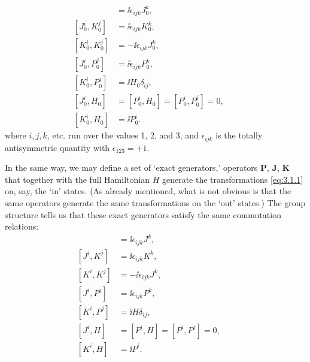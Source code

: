 \begin{align}
[J_0^i,J_0^j]&=\ii\epsilon_{ijk}J_0^k, &&\tag{3.3.4}\label{eq:3.3.4}\\
[J_0^i,K_0^j]&=\ii\epsilon_{ijk}K_0^k, &&\tag{3.3.5}\label{eq:3.3.5}\\
[K_0^i,K_0^j]&=-\ii\epsilon_{ijk}J_0^k, &&\tag{3.3.6}\label{eq:3.3.6}\\
[J_0^i,P_0^j]&=\ii\epsilon_{ijk}P_0^k, &&\tag{3.3.7}\label{eq:3.3.7}\\
[K_0^i,P_0^j]&=\ii H_0\delta_{ij}, &&\tag{3.3.8}\label{eq:3.3.8}\\
[J_0^i,H_0]&=[P_0^i,H_0]=[P_0^i,P_0^j]=0, &&\tag{3.3.9}\label{eq:3.3.9}\\
[K_0^i,H_0]&=\ii P_0^i. &&\tag{3.3.10}\label{eq:3.3.10}
\end{align}
where $i,j,k$, etc. run over the values 1, 2, and 3, and $\epsilon_{ijk}$ is the
totally antisymmetric quantity with $\epsilon_{123}=+1$.

In the same way, we may define a set of `exact generators,' operators
$\mathbf{P}$, $\mathbf{J}$, $\mathbf{K}$ that together with the full Hamiltonian
$H$ generate the transformations \eqref{eq:3.1.1} on, say, the `in' states. (As already
mentioned, what is not obvious is that the same operators generate the same
transformations on the `out' states.) The group structure tells us that these
exact generators satisfy the same commutation relations:
\begin{align}
[J^i,J^j]&=\ii\epsilon_{ijk}J^k, &&\tag{3.3.11}\label{eq:3.3.11}\\
[J^i,K^j]&=\ii\epsilon_{ijk}K^k, &&\tag{3.3.12}\label{eq:3.3.12}\\
[K^i,K^j]&=-\ii\epsilon_{ijk}J^k, &&\tag{3.3.13}\label{eq:3.3.13}\\
[J^i,P^j]&=\ii\epsilon_{ijk}P^k, &&\tag{3.3.14}\label{eq:3.3.14}\\
[K^i,P^j]&=\ii H\delta_{ij}, &&\tag{3.3.15}\label{eq:3.3.15}\\
[J^i,H]&=[P^i,H]=[P^i,P^j]=0, &&\tag{3.3.16}\label{eq:3.3.16}\\
[K^i,H]&=\ii P^i. &&\tag{3.3.17}\label{eq:3.3.17}
\end{align}


